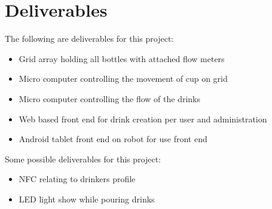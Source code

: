 \documentclass[letterpaper]{article}
\begin{document}
\section{Deliverables}

The following are deliverables for this project:
\begin{itemize}
    \item Grid array holding all bottles with attached flow meters
    \item Micro computer controlling the movement of cup on grid
    \item Micro computer controlling the flow of the drinks
    \item Web based front end for drink creation per user and 
          administration
    \item Android tablet front end on robot for use front end    \end{itemize}

Some possible deliverables for this project:
\begin{itemize}
    \item NFC relating to drinkers profile
    \item LED light show while pouring drinks
\end{itemize}    



\end{document}
